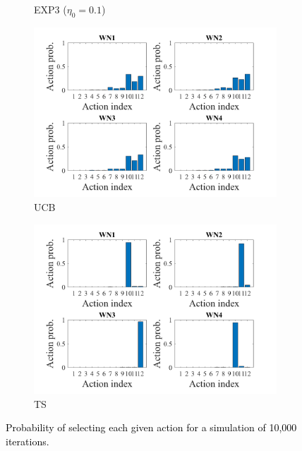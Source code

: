 \documentclass{article}
\begin{document}
\begin{figure}[t!]
\begin{subfigure}[b]{0.43\textwidth}
			\caption{EXP3 ($\eta_0 = 0.1$)}
			\label{fig:actions_probability_EXP3}
		\end{subfigure}
		\begin{subfigure}[b]{0.43\textwidth}
			\includegraphics[width=\textwidth]{images/actions_probability_UCB}
			\caption{UCB}
			\label{fig:actions_probability_UCB}
		\end{subfigure}
		\begin{subfigure}[b]{0.43\textwidth}
			\includegraphics[width=\textwidth]{images/actions_probability_TS}
			\caption{TS}
			\label{fig:actions_probability_TS}
		\end{subfigure}
		\caption{\textcolor{black}{Probability of selecting each given action for a simulation of 10,000 iterations.}}
		\label{fig:actions_probabilities}
	\end{figure}
	
\end{document}

